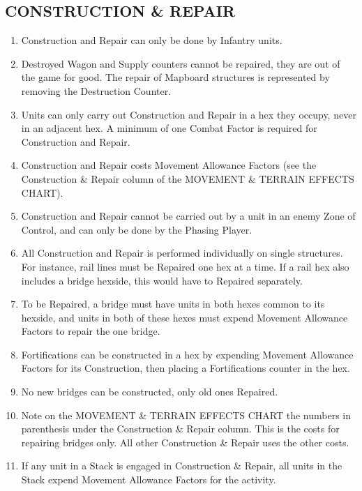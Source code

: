 \subsection{CONSTRUCTION \& REPAIR}

\begin{enumerate}
  \item Construction and Repair can only be done by Infantry units.

  \item Destroyed Wagon and Supply counters cannot be repaired, they are out of the game for good. The repair of Mapboard structures is represented by removing the Destruction Counter.

  \item Units can only carry out Construction and Repair in a hex they occupy, never in an adjacent hex. A minimum of one Combat Factor is required for Construction and Repair.

  \item Construction and Repair costs Movement Allowance Factors (see the Construction \& Repair column of the MOVEMENT \& TERRAIN EFFECTS CHART).

  \item Construction and Repair cannot be carried out by a unit in an enemy Zone of Control, and can only be done by the Phasing Player.

  \item All Construction and Repair is performed individually on single structures. For instance, rail lines must be Repaired one hex at a time. If a rail hex also includes a bridge hexside, this would have to Repaired separately.

  \item To be Repaired, a bridge must have units in both hexes common to its hexside, and units in both of these hexes must expend Movement Allowance Factors to repair the one bridge.

  \item Fortifications can be constructed in a hex by expending Movement Allowance Factors for its Construction, then placing a Fortifications counter in the hex.

  \item No new bridges can be constructed, only old ones Repaired.

  \item Note on the MOVEMENT \& TERRAIN EFFECTS CHART the numbers in parenthesis under the Construction \& Repair column. This is the costs for repairing bridges only. All other Construction \& Repair uses the other costs.

  \item If any unit in a Stack is engaged in Construction \& Repair, all units in the Stack expend Movement Allowance Factors for the activity.
\end{enumerate}